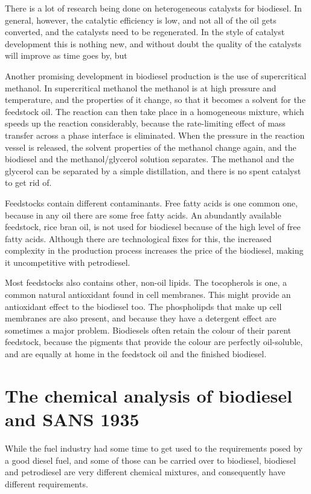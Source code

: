 There is a lot of research being done on heterogeneous catalysts for biodiesel. In general, however, the catalytic efficiency is low, and not all of the oil gets converted, and the catalysts need to be regenerated. In the style of catalyst development this is nothing new, and without doubt the quality of the catalysts will improve as time goes by, but

Another promising development in biodiesel production is the use of supercritical methanol. In supercritical methanol the methanol is at high pressure and temperature, and the properties of it change, so that it becomes a solvent for the feedstock oil. The reaction can then take place in a homogeneous mixture, which speeds up the reaction considerably, because the rate-limiting effect of mass transfer across a phase interface is eliminated. When the pressure in the reaction vessel is released, the solvent properties of the methanol change again, and the biodiesel and the methanol/glycerol solution separates. The methanol and the glycerol can be separated by a simple distillation, and there is no spent catalyst to get rid of. 

Feedstocks contain different contaminants. Free fatty acids is one common one, because in any oil there are some free fatty acids. An abundantly available feedstock, rice bran oil, is not used for biodiesel because of the high level of free fatty acids. Although there are technological fixes for this, the increased complexity in the production process increases the price of the biodiesel, making it uncompetitive with petrodiesel.

Most feedstocks also contains other, non-oil lipids. The tocopherols is one, a common natural antioxidant found in cell membranes. This might provide an antioxidant effect to the biodiesel too. The phospholipds that make up cell membranes are also present, and because they have a detergent effect are sometimes a major problem. Biodiesels often retain the colour of their parent feedstock, because the pigments that provide the colour are perfectly oil-soluble, and are equally at home in the feedstock oil and the finished biodiesel.

\section{The chemical analysis of biodiesel and SANS 1935}

While the fuel industry had some time to get used to the requirements posed by a good diesel fuel, and some of those can be carried over to biodiesel, biodiesel and petrodiesel are very different chemical mixtures, and consequently have different requirements.

